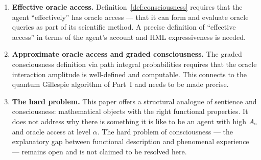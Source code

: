 \begin{enumerate}[label=\textbf{Gap \arabic*.}, leftmargin=*, itemsep=8pt]
  \item \textbf{Effective oracle access.}
        Definition~\ref{def:consciousness} requires that the agent
        ``effectively'' has oracle access --- that it can form and
        evaluate oracle queries as part of its scientific method.
        A precise definition of ``effective access'' in terms of
        the agent's account and HML expressiveness is needed.

  \item \textbf{Approximate oracle access and graded consciousness.}
        The graded consciousness definition via path integral
        probabilities requires that the oracle interaction amplitude
        is well-defined and computable.
        This connects to the quantum Gillespie algorithm of
        Part~I and needs to be made precise.

  \item \textbf{The hard problem.}
        This paper offers a structural analogue of sentience and
        consciousness: mathematical objects with the right
        functional properties.
        It does not address why there is something it is like to
        be an agent with high $A_{\mathrm{s}}$ and oracle access at level
        $\alpha$.
        The hard problem of consciousness --- the explanatory gap
        between functional description and phenomenal experience
        --- remains open and is not claimed to be resolved here.

\end{enumerate}

